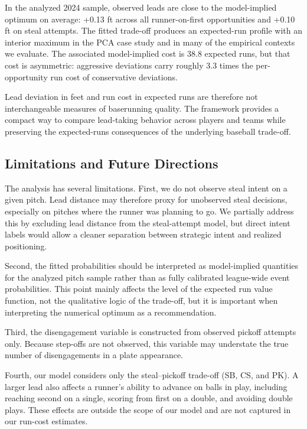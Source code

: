 \documentclass[12pt,letterpaper]{article}
\begin{document}
In the analyzed 2024 sample, observed leads are close to the model-implied optimum on average: +0.13 ft across all runner-on-first opportunities and +0.10 ft on steal attempts. The fitted trade-off produces an expected-run profile with an interior maximum in the PCA case study and in many of the empirical contexts we evaluate. The associated model-implied cost is 38.8 expected runs, but that cost is asymmetric: aggressive deviations carry roughly 3.3 times the per-opportunity run cost of conservative deviations.

Lead deviation in feet and run cost in expected runs are therefore not interchangeable measures of baserunning quality. The framework provides a compact way to compare lead-taking behavior across players and teams while preserving the expected-runs consequences of the underlying baseball trade-off.

\subsection{Limitations and Future Directions}

The analysis has several limitations. First, we do not observe steal intent on a given pitch. Lead distance may therefore proxy for unobserved steal decisions, especially on pitches where the runner was planning to go. We partially address this by excluding lead distance from the steal-attempt model, but direct intent labels would allow a cleaner separation between strategic intent and realized positioning.

Second, the fitted probabilities should be interpreted as model-implied quantities for the analyzed pitch sample rather than as fully calibrated league-wide event probabilities. This point mainly affects the level of the expected run value function, not the qualitative logic of the trade-off, but it is important when interpreting the numerical optimum as a recommendation.

Third, the disengagement variable is constructed from observed pickoff attempts only. Because step-offs are not observed, this variable may understate the true number of disengagements in a plate appearance.

Fourth, our model considers only the steal--pickoff trade-off (SB, CS, and PK). A larger lead also affects a runner's ability to advance on balls in play, including reaching second on a single, scoring from first on a double, and avoiding double plays. These effects are outside the scope of our model and are not captured in our run-cost estimates.
\end{document}
